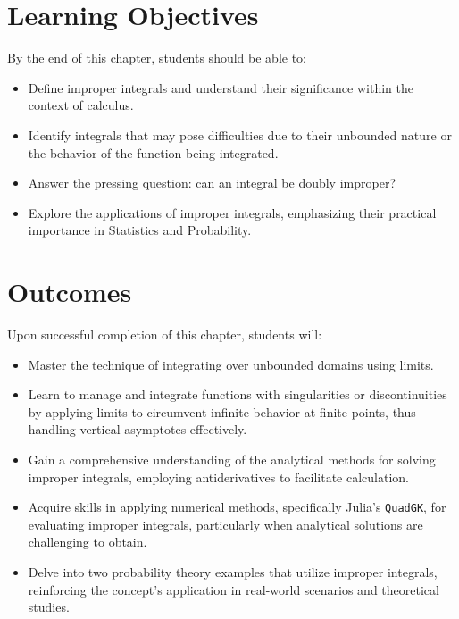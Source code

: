 \section*{Learning Objectives}

By the end of this chapter, students should be able to:
\begin{itemize}
    \item Define improper integrals and understand their significance within the context of calculus.
    \item Identify integrals that may pose difficulties due to their unbounded nature or the behavior of the function being integrated.
    \item  Answer the pressing question: can an integral be doubly improper?
    \item Explore the applications of improper integrals, emphasizing their practical importance in Statistics and Probability.
\end{itemize}

\section*{Outcomes}

Upon successful completion of this chapter, students will:
\begin{itemize}
    \item Master the technique of integrating over unbounded domains using limits.
    \item Learn to manage and integrate functions with singularities or discontinuities by applying limits to circumvent infinite behavior at finite points, thus handling vertical asymptotes effectively.
    \item Gain a comprehensive understanding of the analytical methods for solving improper integrals, employing antiderivatives to facilitate calculation.
    \item Acquire skills in applying numerical methods, specifically Julia's \texttt{QuadGK}, for evaluating improper integrals, particularly when analytical solutions are challenging to obtain.
    \item Delve into two probability theory examples that utilize improper integrals, reinforcing the concept’s application in real-world scenarios and theoretical studies.
\end{itemize}




\newpage




